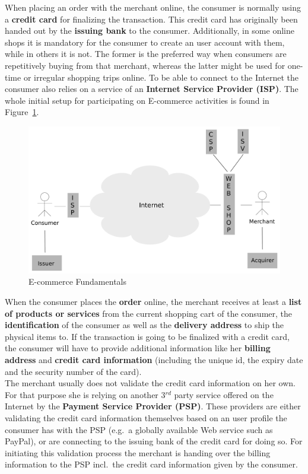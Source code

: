 When placing an order with the merchant online, the consumer is normally using a \textbf{credit card} for finalizing the transaction. This credit card has originally been handed out by the \textbf{issuing bank} to the consumer. Additionally, in some online shops it is mandatory for the consumer to create an user account with them, while in others it is not. The former is the preferred way when consumers are repetitively buying from that merchant, whereas the latter might be used for one-time or irregular shopping trips online. To be able to connect to the Internet the consumer also relies on a service of an \textbf{Internet Service Provider (\gls{ISP})}. The whole initial setup for participating on E-commerce activities is found in Figure~\ref{fig:images_ecommerce_scenario}.\@

\begin{figure}[H]
	\centering
		\includegraphics[width=0.8\columnwidth]{images/e-commerce-scenario.pdf}
	\caption{E-commerce Fundamentals}
\label{fig:images_ecommerce_scenario}
\end{figure}

When the consumer places the \textbf{order} online, the merchant receives at least a \textbf{list of products or services} from the current shopping cart of the consumer, the \textbf{identification} of the consumer as well as the \textbf{delivery address} to ship the physical items to. If the transaction is going to be finalized with a credit card, the consumer will have to provide additional information like her \textbf{billing address} and \textbf{credit card information} (including the unique id, the expiry date and the security number of the card). \\

The merchant usually does not validate the credit card information on her own. For that purpose she is relying on another 3$^{rd}$ party service offered on the Internet by the \textbf{Payment Service Provider (\gls{PSP})}. These providers are either validating the credit card information themselves based on an user profile the consumer has with the \gls{PSP} (e.g.\ a globally available Web service such as PayPal), or are connecting to the issuing bank of the credit card for doing so. For initiating this validation process the merchant is handing over the billing information to the \gls{PSP} incl.\ the credit card information given by the consumer. \\

